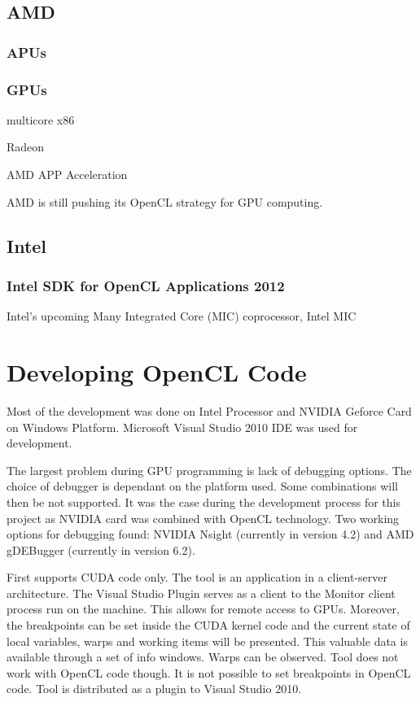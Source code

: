 \subsection{AMD}
\subsubsection{APUs}
\subsubsection{GPUs}
multicore x86

Radeon

AMD APP Acceleration 


AMD is still pushing its OpenCL strategy for GPU computing. 

\subsection{Intel}
\subsubsection{Intel SDK for OpenCL Applications 2012}

Intel's upcoming Many Integrated Core (MIC) coprocessor, Intel MIC





\section{Developing OpenCL Code}
Most of the development was done on Intel Processor and NVIDIA Geforce Card on Windows Platform. Microsoft Visual Studio 2010 IDE was used for development.

The largest problem during GPU programming is lack of debugging options. The choice of debugger is dependant on the platform used. Some combinations will then be not supported. It was the case during the development process for this project as NVIDIA card was combined with OpenCL technology.  Two working options for debugging found: NVIDIA Nsight (currently in version 4.2) and AMD gDEBugger (currently in version 6.2).

First supports CUDA code only. The tool is an application in a client-server architecture.  The Visual Studio Plugin serves as a client to the Monitor client process run on the machine. This allows for remote access to GPUs. Moreover, the breakpoints can be set inside the CUDA kernel code and the current state of local variables, warps and working items will be presented. This valuable data is available through a set of info windows. Warps can be observed. Tool does not work with OpenCL code though. It is not possible to set breakpoints in OpenCL code. Tool is distributed as a plugin to Visual Studio 2010.

